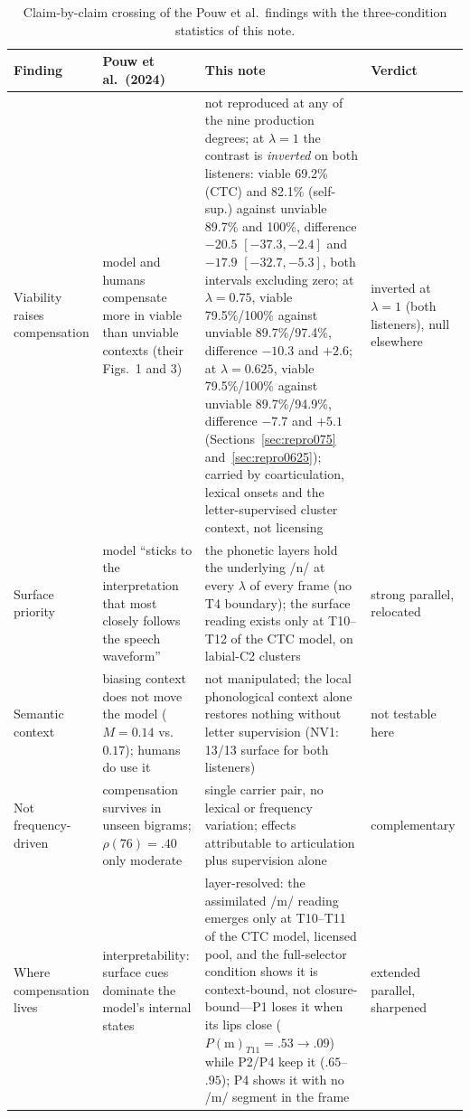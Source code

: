 \documentclass[11pt,a4paper]{article}
\newcommand{\lam}{\lambda}
\begin{document}
\begin{table}[t]
\small
\begin{tabularx}{\textwidth}{@{}>{\raggedright\arraybackslash}p{}YY>{\raggedright\arraybackslash}p{0.17\textwidth}@{}}
\toprule
\textbf{Finding} & \textbf{Pouw et al.\ (2024)} & \textbf{This note} &
\textbf{Verdict} \\
\midrule
Viability raises compensation & model and humans compensate more in
viable than unviable contexts (their Figs.~1 and 3) & not reproduced
at any of the nine production degrees; at $\lam=1$ the contrast is
\emph{inverted} on both listeners: viable 69.2\% (CTC) and 82.1\%
(self-sup.) against unviable 89.7\% and 100\%, difference $-20.5$
$[-37.3, -2.4]$ and $-17.9$ $[-32.7, -5.3]$, both intervals
excluding zero; at $\lam=0.75$, viable 79.5\%/100\% against
unviable 89.7\%/97.4\%, difference $-10.3$ and $+2.6$; at
$\lam=0.625$, viable 79.5\%/100\% against unviable
89.7\%/94.9\%, difference $-7.7$ and $+5.1$
(Sections~\ref{sec:repro075} and~\ref{sec:repro0625}); carried by
coarticulation, lexical onsets and the letter-supervised cluster
context, not licensing & inverted at $\lam=1$ (both listeners),
null elsewhere \\
Surface priority & model ``sticks to the interpretation that most
closely follows the speech waveform'' & the phonetic layers hold the
underlying /n/ at every $\lam$ of every frame (no T4 boundary); the
surface reading exists only at T10--T12 of the CTC model, on
labial-C2 clusters & strong parallel, relocated \\
Semantic context & biasing context does not move the model
($M = 0.14$ vs.\ $0.17$); humans do use it & not manipulated; the
local phonological context alone restores nothing without letter
supervision (NV1: 13/13 surface for both listeners) & not testable
here \\
Not frequency-driven & compensation survives in unseen bigrams;
$\rho(76) = .40$ only moderate & single carrier pair, no lexical or
frequency variation; effects attributable to articulation plus
supervision alone & complementary \\
Where compensation lives & interpretability: surface cues dominate
the model's internal states & layer-resolved: the assimilated /m/
reading emerges only at T10--T11 of the CTC model, licensed pool,
and the full-selector condition shows it is context-bound, not
closure-bound---P1 loses it when its lips close
($P(\mathrm{m})_{T11} = .53 \rightarrow .09$) while P2/P4 keep it
($.65$--$.95$); P4 shows it with no /m/ segment in the frame &
extended parallel, sharpened \\
\bottomrule
\end{tabularx}
\caption{Claim-by-claim crossing of the Pouw et al.\ findings with the
three-condition statistics of this note.}
\label{tab:cross}
\end{table}
\end{document}
